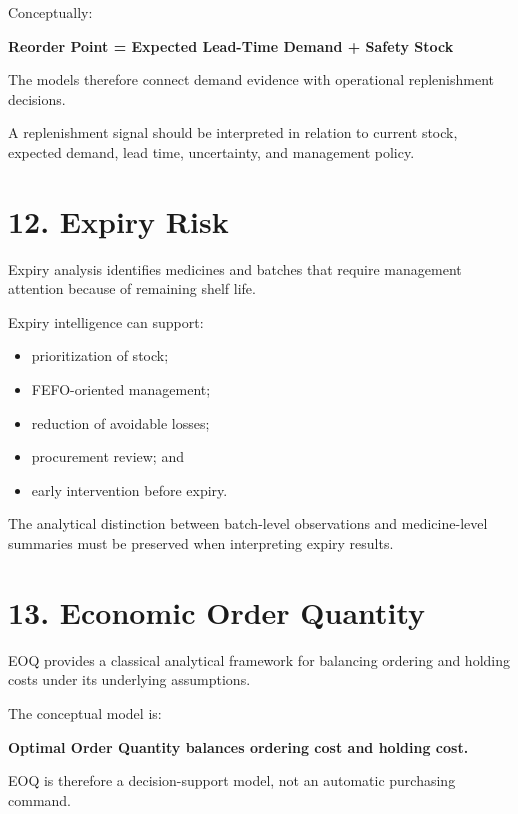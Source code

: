 \documentclass[12pt,a4paper]{article}
\begin{document}
Conceptually:

\begin{center}
\textbf{Reorder Point = Expected Lead-Time Demand + Safety Stock}
\end{center}

The models therefore connect demand evidence with operational replenishment decisions.

\begin{notebox}
A replenishment signal should be interpreted in relation to current stock, expected demand, lead time, uncertainty, and management policy.
\end{notebox}

\section*{12. Expiry Risk}

Expiry analysis identifies medicines and batches that require management attention because of remaining shelf life.

Expiry intelligence can support:

\begin{itemize}[leftmargin=1cm]
\item prioritization of stock;
\item FEFO-oriented management;
\item reduction of avoidable losses;
\item procurement review; and
\item early intervention before expiry.
\end{itemize}

The analytical distinction between batch-level observations and medicine-level summaries must be preserved when interpreting expiry results.

\section*{13. Economic Order Quantity}

EOQ provides a classical analytical framework for balancing ordering and holding costs under its underlying assumptions.

The conceptual model is:

\begin{center}
\textbf{Optimal Order Quantity balances ordering cost and holding cost.}
\end{center}

EOQ is therefore a decision-support model, not an automatic purchasing command.
\end{document}
